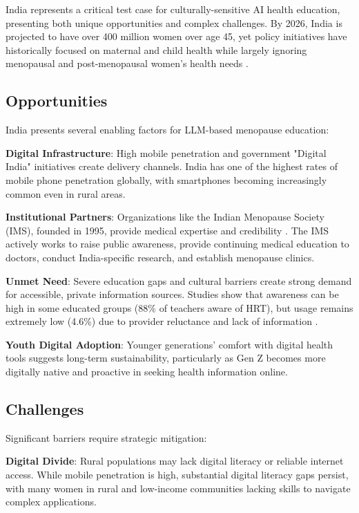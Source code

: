 \documentclass[letterpaper]{article} %
\begin{document}
India represents a critical test case for culturally-sensitive AI health education, presenting both unique opportunities and complex challenges. By 2026, India is projected to have over 400 million women over age 45, yet policy initiatives have historically focused on maternal and child health while largely ignoring menopausal and post-menopausal women's health needs \cite{timesofindia2023silence}.

\subsection{Opportunities}

India presents several enabling factors for LLM-based menopause education:

\textbf{Digital Infrastructure}: High mobile penetration and government "Digital India" initiatives create delivery channels. India has one of the highest rates of mobile phone penetration globally, with smartphones becoming increasingly common even in rural areas.

\textbf{Institutional Partners}: Organizations like the Indian Menopause Society (IMS), founded in 1995, provide medical expertise and credibility \cite{indianmenopausesociety2023}. The IMS actively works to raise public awareness, provide continuing medical education to doctors, conduct India-specific research, and establish menopause clinics.

\textbf{Unmet Need}: Severe education gaps and cultural barriers create strong demand for accessible, private information sources. Studies show that awareness can be high in some educated groups (88\% of teachers aware of HRT), but usage remains extremely low (4.6\%) due to provider reluctance and lack of information \cite{ijogr2023knowledge}.

\textbf{Youth Digital Adoption}: Younger generations' comfort with digital health tools suggests long-term sustainability, particularly as Gen Z becomes more digitally native and proactive in seeking health information online.

\subsection{Challenges}

Significant barriers require strategic mitigation:

\textbf{Digital Divide}: Rural populations may lack digital literacy or reliable internet access. While mobile penetration is high, substantial digital literacy gaps persist, with many women in rural and low-income communities lacking skills to navigate complex applications.
\end{document}
